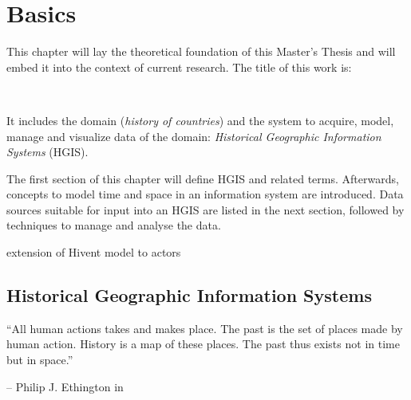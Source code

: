 

\chapter{Basics} %
\label{cha:basics}

This chapter will lay the theoretical foundation of this Master's Thesis and will embed it into the context of current research. The title of this work is:

\vspace{-1em}
\begin{center}
\textbf{\titleFirst \\ \titleSecond}
\end{center}

It includes the domain (\emph{history of countries}) and the system to acquire, model, manage and visualize data of the domain: \emph{Historical Geographic Information Systems} (HGIS).

The first section of this chapter will define HGIS and related terms. Afterwards, concepts to model time and space in an information system are introduced. Data sources suitable for input into an HGIS are listed in the next section, followed by techniques to manage and analyse the data.

extension of Hivent model to actors



\section{Historical Geographic Information Systems} %
\label{sec:historical_geographic_information_systems}

\begin{quoteit}
  ``All human actions takes and makes place. The past is the set of places made by human action. History is a map of these places. The past thus exists not in time but in space.''
\end{quoteit}
\hfill -- Philip J. Ethington in \cite[précis]{citeTakeMakePlace}


